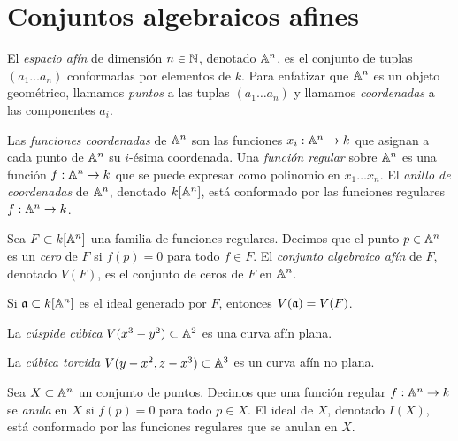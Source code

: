 \section{Conjuntos algebraicos afines}

\begin{definition}
El \textit{espacio afín} de dimensión $n \in \mathbb N$, denotado $\mathbb A^n$, es el conjunto de tuplas $(a_1 \dots a_n)$ conformadas por elementos de $k$. Para enfatizar que $\mathbb A^n$ es un objeto geométrico, llamamos \textit{puntos} a las tuplas $(a_1 \dots a_n)$ y llamamos \textit{coordenadas} a las componentes $a_i$.
\end{definition}

\begin{definition}
Las \textit{funciones coordenadas} de $\mathbb A^n$ son las funciones $x_i : \mathbb A^n \to k$ que asignan a cada punto de $\mathbb A^n$ su $i$-ésima coordenada. Una \textit{función regular} sobre $\mathbb A^n$ es una función $f : \mathbb A^n \to k$ que se puede expresar como polinomio en $x_1 \dots x_n$. El \textit{anillo de coordenadas} de $\mathbb A^n$, denotado $k[\mathbb A^n]$, está conformado por las funciones regulares $f : \mathbb A^n \to k$.
\end{definition}

\begin{definition}
Sea $F \subset k[\mathbb A^n]$ una familia de funciones regulares. Decimos que el punto $p \in \mathbb A^n$ es un \textit{cero} de $F$ si $f(p) = 0$ para todo $f \in F$. El \textit{conjunto algebraico afín} de $F$, denotado $V(F)$, es el conjunto de ceros de $F$ en $\mathbb A^n$.
\end{definition}

\begin{remark}
Si $\mathfrak a \subset k[\mathbb A^n]$ es el ideal generado por $F$, entonces $V(\mathfrak a) = V(F)$.
\end{remark}

\begin{example}
La \textit{cúspide cúbica} $V(x^3 - y^2) \subset \mathbb A^2$ es una curva afín plana.
\end{example}

\begin{example}
La \textit{cúbica torcida} $V(y - x^2, z - x^3) \subset \mathbb A^3$ es un curva afín no plana.
\end{example}

\begin{definition}
Sea $X \subset \mathbb A^n$ un conjunto de puntos. Decimos que una función regular $f : \mathbb A^n \to k$ se \textit{anula} en $X$ si $f(p) = 0$ para todo $p \in X$. El ideal de $X$, denotado $I(X)$, está conformado por las funciones regulares que se anulan en $X$.
\end{definition}

